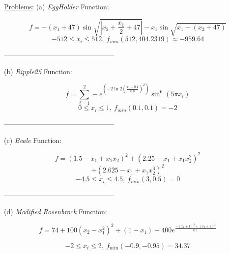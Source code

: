 \documentclass[conference]{IEEEtran}
\begin{document}
\appendix

\underline{Problems}:
\center
 (a) \emph{EggHolder} Function:

  \begin{displaymath}
    f=-(x_1+47)\sin\sqrt{|x_2+\frac{x_1}{2}+47|}-x_1\sin\sqrt{x_1-(x_2+47)}
  \end{displaymath}
  \begin{displaymath}
 -512\leq x_i \leq 512,~ f_{min}(512,404.2319)\approx-959.64
  \end{displaymath}



\center------------------------------------------------

  (b) \emph{Ripple25} Function:

  \begin{displaymath}
    f=\sum_{i=1}^{2}-e^{(-2\ln2(\frac{x_i-0.1}{0.8})^2)}\sin^6(5\pi x_i)
  \end{displaymath}
  \begin{displaymath}
 0\leq x_i \leq 1,~ f_{min}(0.1,0.1)=-2
  \end{displaymath}



\begin{center}
  ------------------------------------------------
\end{center}


  (c) \emph{Beale} Function:

  \begin{displaymath}
    f=(1.5-x_1+x_1x_2)^2+(2.25-x_1+x_1x_2^2)^2
      \end{displaymath}
      \begin{displaymath}
     +(2.625-x_1+x_1x_2^3)^2
      \end{displaymath}
  \begin{displaymath}
 -4.5\leq x_i \leq 4.5,~  f_{min}(3,0.5)=0
  \end{displaymath}


\center------------------------------------------------

(d) \emph{Modified Rosenbrock} Function:

  \begin{displaymath}
     f=74+100(x_2-x_1^2)^2+(1-x_1)-400e^{\frac{-(x_1+1)^2+(x_2+1)^2}{0.1}}
      \end{displaymath}

  \begin{displaymath}
-2\leq x_i \leq 2,~ f_{min}(-0.9,-0.95)=34.37
  \end{displaymath}
\end{document}
